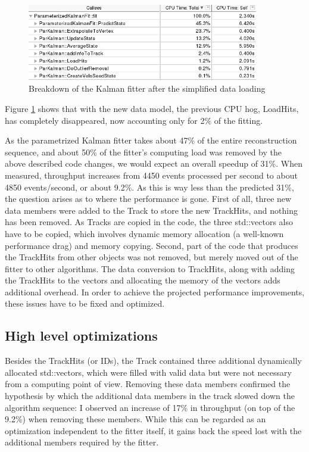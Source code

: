 \documentclass[12pt]{article}
\begin{document}
\begin{figure}[H]
	\begin{center}
		\includegraphics[width=0.9\textwidth]{kalmanfit_simplified_overall_breakdown}
	\end{center}
	\caption{Breakdown of the Kalman fitter after the simplified data loading}
	\label{fig_kalmanfit_simplified_overall_breakdown}
\end{figure}

Figure \ref{fig_kalmanfit_simplified_overall_breakdown} shows that with the new data model, the previous CPU hog, LoadHits, has completely disappeared, now accounting only for 2\% of the fitting.

As the parametrized Kalman fitter takes about 47\% of the entire reconstruction sequence, and about 50\% of the fitter's computing load was removed by the above described code changes, we would expect an overall speedup of 31\%. When measured, throughput increases from 4450 events processed per second to about 4850 events/second, or about 9.2\%. As this is way less than the predicted 31\%, the question arises as to where the performance is gone. First of all, three new data members were added to the Track to store the new TrackHits, and nothing has been removed. As Tracks are copied in the code, the three std::vectors also have to be copied, which involves dynamic memory allocation (a well-known performance drag) and memory copying. Second, part of the code that produces the TrackHits from other objects was not removed, but merely moved out of the fitter to other algorithms. The data conversion to TrackHits, along with adding the TrackHits to the vectors and allocating the memory of the vectors adds additional overhead. In order to achieve the projected performance improvements, these issues have to be fixed and optimized.


\subsection{High level optimizations}

Besides the TrackHits (or IDs), the Track contained three additional dynamically allocated std::vectors, which were filled with valid data but were not necessary from a computing point of view. Removing these data members confirmed the hypothesis by which the additional data members in the track slowed down the algorithm sequence: I observed an increase of 17\% in throughput (on top of the 9.2\%) when removing these members. While this can be regarded as an optimization independent to the fitter itself, it gains back the speed lost with the additional members required by the fitter.
\end{document}
